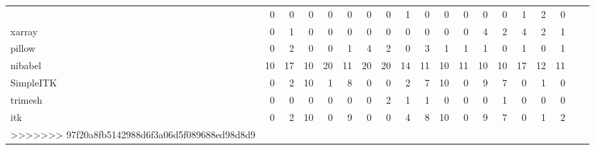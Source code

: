 \begin{tabular}{lrrrrrrrrrrrrrrrrrr}
\begin{tabular}{lrrrrrrrrrrrrrrrr}
statsmodels & 0 & 0 & 0 & 0 & 0 & 0 & 0 & 1 & 0 & 0 & 0 & 0 & 0 & 1 & 2 & 0 \\
xarray & 0 & 1 & 0 & 0 & 0 & 0 & 0 & 0 & 0 & 0 & 0 & 4 & 2 & 4 & 2 & 1 \\
pillow & 0 & 2 & 0 & 0 & 1 & 4 & 2 & 0 & 3 & 1 & 1 & 1 & 0 & 1 & 0 & 1 \\
nibabel & 10 & 17 & 10 & 20 & 11 & 20 & 20 & 14 & 11 & 10 & 11 & 10 & 10 & 17 & 12 & 11 \\
SimpleITK & 0 & 2 & 10 & 1 & 8 & 0 & 0 & 2 & 7 & 10 & 0 & 9 & 7 & 0 & 1 & 0 \\
trimesh & 0 & 0 & 0 & 0 & 0 & 0 & 2 & 1 & 1 & 0 & 0 & 0 & 1 & 0 & 0 & 0 \\
itk & 0 & 2 & 10 & 0 & 9 & 0 & 0 & 4 & 8 & 10 & 0 & 9 & 7 & 0 & 1 & 2 \\
>>>>>>> 97f20a8fb5142988d6f3a06d5f089688ed98d8d9
\bottomrule
\end{tabular}
